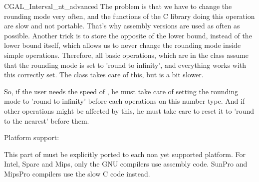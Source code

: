 \begin{ccAdvanced}
\begin{ccClass} {CGAL_Interval_nt_advanced}
The problem is that we have to change the rounding mode very often, and the
functions of the C library doing this operation are slow and not portable.
That's why assembly versions are used as often as possible.
Another trick is to store the opposite of the lower bound, instead of the
lower bound itself, which allows us to never change the rounding mode inside
simple operations.  Therefore, all basic operations, which are in the class 
 assume that the rounding mode is set to 
'round to infinity', and everything works with this correctly set.  
The class  takes care of this, but is a bit slower.

So, if the user needs the speed of , he must
take care of setting the rounding mode to 'round to infinity' before each
operations on this number type.  And if other operations might be affected by
this, he must take care to reset it to 'round to the nearest' before them.


Platform support:

This part of {\cgal} must be explicitly ported to each non yet supported
platform.  For Intel, Sparc and Mips, only the GNU compilers use assembly
code.  SunPro and MipsPro compilers use the slow C code instead.


\end{ccClass}
\end{ccAdvanced}
